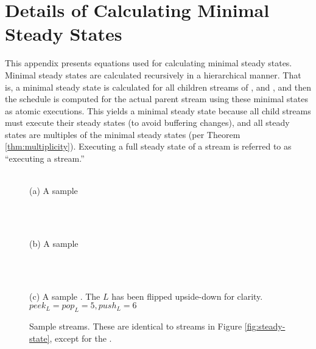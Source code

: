 \section{Details of Calculating Minimal Steady States}
\label{apx:eqs}

This appendix presents equations used for calculating minimal
steady states.  Minimal steady states are calculated recursively
in a hierarchical manner. That is, a minimal steady state is
calculated for all children streams of {\pipeline}, {\splitjoin}
and {\feedbackloop}, and then the schedule is computed for the
actual parent stream using these minimal states as atomic
executions. This yields a minimal steady state because all child
streams must execute their steady states (to avoid buffering
changes), and all steady states are multiples of the minimal
steady states (per Theorem \ref{thm:multiplicity}).  Executing a
full steady state of a stream is referred to as ``executing a
stream.''

\begin{figure}
\begin{center}

\begin{minipage}{1.5in}
\centering {} \\
{\protect\small (a) A sample {\pipeline}}
\end{minipage}
~
\begin{minipage}{1.5in}
\centering {} \\
{\protect\small (b) A sample {\splitjoin}}
\end{minipage}
~
\begin{minipage}{2in}
\centering {} \\
{\protect\small (c) A sample {\feedbackloop}.  The $L$ {\filter}
has been flipped upside-down for clarity.\\$peek_L = pop_L = 5,
push_L = 6$}
\end{minipage}

\caption{Sample {\StreamIt} streams. These are identical to
streams in Figure \ref{fig:steady-state}, except for the
{\pipeline}.} \label{fig:app:steady-state}

\end{center}
\end{figure}

\subsection{\filter}

